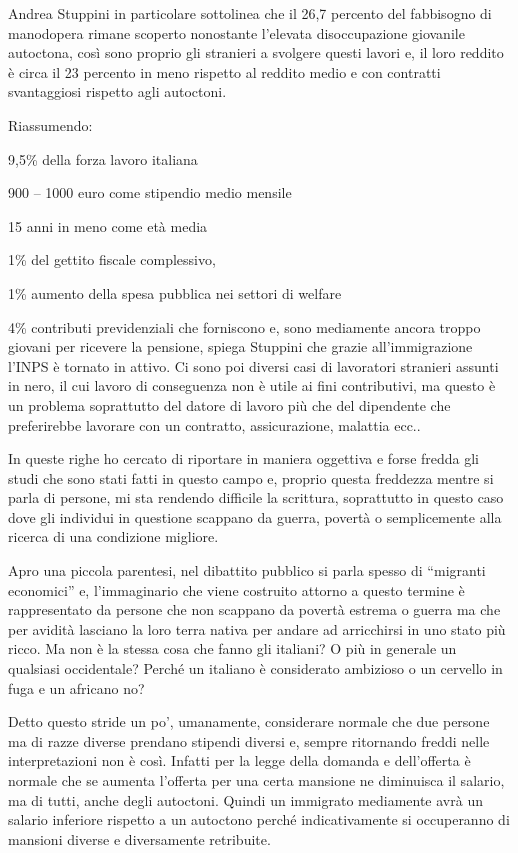 \documentclass[12pt]{book} %
\begin{document}
Andrea Stuppini in particolare sottolinea che il 26,7 percento del fabbisogno di manodopera rimane scoperto nonostante
l'elevata disoccupazione giovanile autoctona, così sono proprio gli stranieri a svolgere questi lavori e, il loro
reddito è circa il 23 percento in meno rispetto al reddito medio e con contratti svantaggiosi rispetto agli autoctoni. 


\bigskip

Riassumendo: 

9,5\% della forza lavoro italiana

900 – 1000 euro come stipendio medio mensile

15 anni in meno come età media

1\% del gettito fiscale complessivo, 

1\% aumento della spesa pubblica nei settori di welfare

4\% contributi previdenziali che forniscono e, sono mediamente ancora troppo giovani per ricevere la pensione, spiega
Stuppini che grazie all'immigrazione l'INPS è tornato in attivo. Ci sono poi
diversi casi di lavoratori stranieri assunti in nero, il cui lavoro di conseguenza non è utile ai fini contributivi, ma
questo è un problema soprattutto del datore di lavoro più che del dipendente che preferirebbe lavorare con un
contratto, assicurazione, malattia ecc..


\bigskip

In queste righe ho cercato di riportare in maniera oggettiva e forse fredda gli studi che sono stati fatti in questo
campo e, proprio questa freddezza mentre si parla di persone, mi sta rendendo difficile la scrittura, soprattutto in
questo caso dove gli individui in questione scappano da guerra, povertà o semplicemente alla ricerca di una condizione
migliore.

Apro una piccola parentesi, nel dibattito pubblico si parla spesso di “migranti economici” e,
l'immaginario che viene costruito attorno a questo termine è rappresentato da persone che non
scappano da povertà estrema o guerra ma che per avidità lasciano la loro terra nativa per andare ad arricchirsi in uno
stato più ricco. Ma non è la stessa cosa che fanno gli italiani? O più in generale un qualsiasi occidentale? Perché un
italiano è considerato ambizioso o un cervello in fuga e un africano no?

Detto questo stride un po', umanamente, considerare normale che due persone ma di razze diverse prendano stipendi
diversi e, sempre ritornando freddi nelle interpretazioni non è così. Infatti per la legge della domanda e
dell'offerta è normale che se aumenta l'offerta per una certa mansione ne
diminuisca il salario, ma di tutti, anche degli autoctoni. Quindi un immigrato mediamente avrà un salario inferiore
rispetto a un autoctono perché indicativamente si occuperanno di mansioni diverse e diversamente retribuite.
\end{document}
